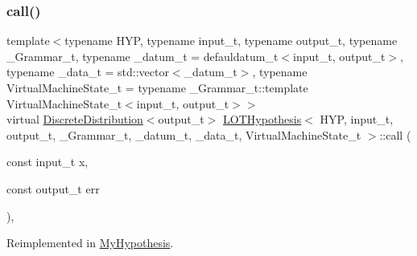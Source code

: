 \subsubsection{\texorpdfstring{call()}{call()}\hspace{0.1cm}{\footnotesize\ttfamily [2/2]}}
{\footnotesize\ttfamily template$<$typename H\+YP, typename input\+\_\+t, typename output\+\_\+t, typename \+\_\+\+Grammar\+\_\+t, typename \+\_\+datum\+\_\+t = defauldatum\+\_\+t$<$input\+\_\+t, output\+\_\+t$>$, typename \+\_\+data\+\_\+t = std\+::vector$<$\+\_\+datum\+\_\+t$>$, typename Virtual\+Machine\+State\+\_\+t = typename \+\_\+\+Grammar\+\_\+t\+::template Virtual\+Machine\+State\+\_\+t$<$input\+\_\+t, output\+\_\+t$>$$>$ \\
virtual \hyperlink{class_discrete_distribution}{Discrete\+Distribution}$<$output\+\_\+t$>$ \hyperlink{class_l_o_t_hypothesis}{L\+O\+T\+Hypothesis}$<$ H\+YP, input\+\_\+t, output\+\_\+t, \+\_\+\+Grammar\+\_\+t, \+\_\+datum\+\_\+t, \+\_\+data\+\_\+t, Virtual\+Machine\+State\+\_\+t $>$\+::call (\begin{DoxyParamCaption}\item[{const input\+\_\+t}]{x,  }\item[{const output\+\_\+t}]{err }\end{DoxyParamCaption})\hspace{0.3cm}{\ttfamily [inline]}, {\ttfamily [virtual]}}



Reimplemented in \hyperlink{class_my_hypothesis_a61391d3f1f6fbbe37663b22e2068ac90}{My\+Hypothesis}.

\mbox{\label{class_l_o_t_hypothesis_a34051e59cc251c4d6bb3caddbe594414}} 
